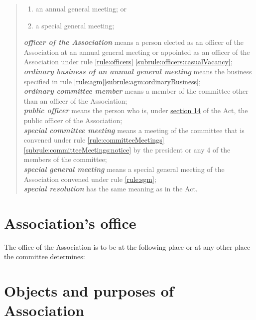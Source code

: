 \documentclass[a4paper,11pt]{article}
\begin{document}
\begin{quote}
	\begin{enumerate}
		\item an annual general meeting; or
		\item a special general meeting;
	\end{enumerate}
	\textit{\textbf{officer of the Association}} means a person elected as an officer of the Association at an annual general meeting or appointed as an officer of the Association under rule \ref{rule:officers} \ref{subrule:officers:casualVacancy};\\
	\textit{\textbf{ordinary business of an annual general meeting}} means the business specified in rule \ref{rule:agm}\ref{subrule:agm:ordinaryBusiness};\\
	\textit{\textbf{ordinary committee member}} means a member of the committee other than an officer of the Association;\\
	\textit{\textbf{public officer}} means the person who is, under \href{https://www.legislation.tas.gov.au/view/html/inforce/2019-05-06/act-1964-064#GS14@EN}{section 14} of the Act, the public officer of the Association;\\
	\textit{\textbf{special committee meeting}} means a meeting of the committee that is convened under rule \ref{rule:committeeMeetings}\ref{subrule:committeeMeetings:notice} by the president or any 4 of the members of the committee;\\
	\textit{\textbf{special general meeting}} means a special general meeting of the Association convened under rule \ref{rule:sgm};\\
	\textit{\textbf{special resolution}}	 has the same meaning as in the Act.
\end{quote}

\section{Association's office}
\label{rule:associationsOffice}

The office of the Association is to be at the following place or at any other place the committee determines:\\
\orgOffice{}

\section{Objects and purposes of Association}
\label{rule:objectsAndPurpose}
\end{document}
